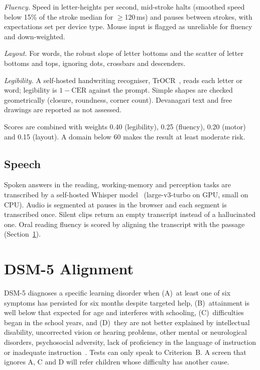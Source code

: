\documentclass[conference]{IEEEtran}
\begin{document}
\emph{Fluency.} Speed in letter-heights per second, mid-stroke halts (smoothed speed
below 15\% of the stroke median for $\geq$120\,ms) and pauses between strokes, with
expectations set per device type. Mouse input is flagged as unreliable for fluency
and down-weighted.

\emph{Layout.} For words, the robust slope of letter bottoms and the scatter of letter
bottoms and tops, ignoring dots, crossbars and descenders.

\emph{Legibility.} A self-hosted handwriting recogniser, TrOCR~\cite{li2023trocr},
reads each letter or word; legibility is $1-\text{CER}$ against the prompt. Simple
shapes are checked geometrically (closure, roundness, corner count). Devanagari text
and free drawings are reported as not assessed.

Scores are combined with weights 0.40 (legibility), 0.25 (fluency), 0.20 (motor) and
0.15 (layout). A domain below 60 makes the result at least moderate risk.

\subsection{Speech}
Spoken answers in the reading, working-memory and perception tasks are transcribed
by a self-hosted Whisper model~\cite{radford2023whisper} (large-v3-turbo on GPU,
small on CPU). Audio is segmented at pauses in the browser and each segment is
transcribed once. Silent clips return an empty transcript instead of a hallucinated
one. Oral reading fluency is scored by aligning the transcript with the passage
(Section~\ref{sec:dsm5}).

\section{DSM-5 Alignment}\label{sec:dsm5}
DSM-5 diagnoses a specific learning disorder when (A)~at least one of six symptoms has
persisted for six months despite targeted help, (B)~attainment is well below that
expected for age and interferes with schooling, (C)~difficulties began in the school
years, and (D)~they are not better explained by intellectual disability, uncorrected
vision or hearing problems, other mental or neurological disorders, psychosocial
adversity, lack of proficiency in the language of instruction or inadequate
instruction~\cite{dsm5}. Tests can only speak to Criterion~B. A screen that ignores A,
C and D will refer children whose difficulty has another cause.
\end{document}
